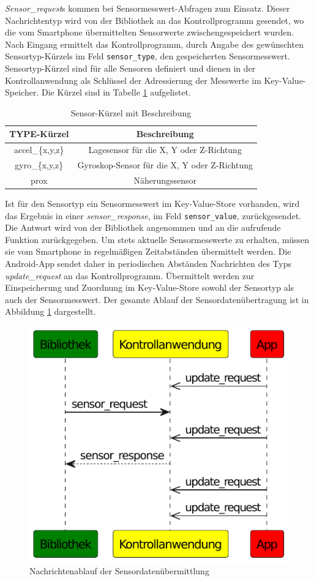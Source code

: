 \documentclass[11pt,a4paper]{report}
\begin{document}
\textit{Sensor\_request}s kommen bei Sensormesswert-Abfragen zum Einsatz.
Dieser Nachrichtentyp wird von der Bibliothek an das Kontrollprogramm gesendet, wo die vom Smartphone übermittelten Sensorwerte zwischengespeichert wurden.
Nach Eingang ermittelt das Kontrollprogramm, durch Angabe des gewünschten Sensortyp-Kürzels im Feld \texttt{sensor\_type}, den gespeicherten Sensormesswert.
Sensortyp-Kürzel sind für alle Sensoren definiert und dienen in der Kontrollanwendung als Schlüssel der Adressierung der Messwerte im Key-Value-Speicher.
Die Kürzel sind in Tabelle \ref{tab:sensor_types} aufgelistet. 
\begin{table}[htbp]
  \centering
  \begin{tabular}{|c|c|}
      \hline
      \textbf{TYPE-Kürzel} & \textbf{Beschreibung} \\
      \hline
      accel\_\{x,y,z\} & Lagesensor für die X, Y oder Z-Richtung \\
      \hline
       gyro\_\{x,y,z\} & Gyroskop-Sensor für die X, Y oder Z-Richtung \\
      \hline
      prox & Näherungssensor \\
      \hline
  \end{tabular}
  \caption{Sensor-Kürzel mit Beschreibung}
  \label{tab:sensor_types}
\end{table}
Ist für den Sensortyp ein Sensormesswert im Key-Value-Store vorhanden, wird das Ergebnis in einer \textit{sensor\_response}, im Feld \texttt{sensor\_value}, zurückgesendet.
Die Antwort wird von der Bibliothek angenommen und an die aufrufende Funktion zurückgegeben.
Um stets aktuelle Sensormesswerte zu erhalten, müssen sie vom Smartphone in regelmäßigen Zeitabständen übermittelt werden.
Die Android-App sendet daher in periodischen Abständen Nachrichten des Typs \textit{update\_request} an das Kontrollprogramm.
Übermittelt werden zur Einspeicherung und Zuordnung im Key-Value-Store sowohl der Sensortyp als auch der Sensormesswert.
Der gesamte Ablauf der Sensordatenübertragung ist in Abbildung \ref{fig:message_flow_requests} dargestellt.
\begin{figure}[htbp]
\centering
\includegraphics[width=.6\textwidth]{images/message_flow_sensor}
\caption{Nachrichtenablauf der Sensordatenübermittlung}
\label{fig:message_flow_requests}
\end{figure}
\end{document}
